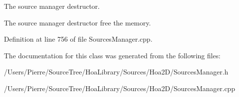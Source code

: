 The source manager destructor. 

The source manager destructor free the memory. 

Definition at line 756 of file Sources\-Manager.\-cpp.



The documentation for this class was generated from the following files\-:\begin{DoxyCompactItemize}
\item 
/\-Users/\-Pierre/\-Source\-Tree/\-Hoa\-Library/\-Sources/\-Hoa2\-D/Sources\-Manager.\-h\item 
/\-Users/\-Pierre/\-Source\-Tree/\-Hoa\-Library/\-Sources/\-Hoa2\-D/Sources\-Manager.\-cpp\end{DoxyCompactItemize}
